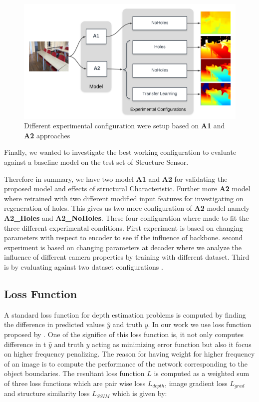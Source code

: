 \begin{figure}[h]
    \centering
    \includegraphics[width = 14cm]{Figures/config_setup.png}
    \caption{Different experimental configuration were setup based on \textbf{A1} and \textbf{A2} approaches}
    \label{fig:Experimental_Setup}
\end{figure}{}

Finally, we wanted to investigate the best working configuration to evaluate against a baseline model on the test set of Structure Sensor. 

Therefore in summary, we have two model \textbf{A1} and \textbf{A2} for validating the proposed model and effects of structural Characteristic. Further more \textbf{A2} model where retrained with two different modified input features for investigating on regeneration of holes. This gives us two more configuration of \textbf{A2} model namely \textbf{A2\_Holes} and \textbf{A2\_NoHoles}. These four configuration where made to fit the three different experimental conditions. First experiment is based on changing parameters with respect to encoder to see if the influence of backbone. second experiment is based on changing parameters at decoder where we analyze the influence of different camera properties by training with different dataset. Third is by evaluating against two dataset configurations .

\subsection{Loss Function}
\label{Chapter5:LossFunction}
A standard loss function for depth estimation problems is computed by finding the difference in predicted values \(\hat{y}\) and truth \(y\). In our work we use loss function proposed by \cite{Alhashim2018}. One of the significe of this loss function is, it not only computes difference in t \(\hat{y}\) and truth \(y\) acting as minimizing error function but also it focus on higher frequency penalizing. The reason for having weight for higher frequency of an image is to compute the performance of the network corresponding to the object boundaries. The resultant loss function \(L\) is computed as a weighted sum of three loss functions which are pair wise loss \(L_{depth}\), image gradient loss \(L_{grad}\) and structure similarity loss  \(L_{SSIM}\) which is given by:



